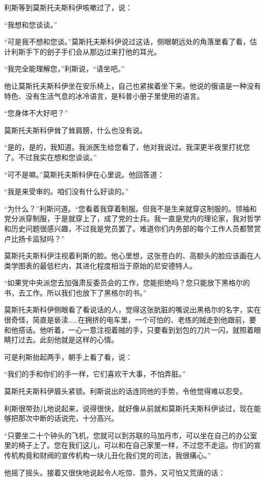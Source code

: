 利斯等到莫斯托夫斯科伊咳嗽过了，说：

“我想和您谈谈。”

“可是我不想和您谈。”莫斯托夫斯科伊说过这话，侧眼朝远处的角落里看了看，估计利斯手下的刽子手们会从那边过来打他的耳光。

“我完全能理解您，”利斯说，“请坐吧。”

他让莫斯托夫斯科伊坐在安乐椅上，自己也紧挨着坐下来。他说的俄语是一种没有特色、没有生活气息的冰冷语言，是科普小册子里使用的语言。

“您身体不大好吧？”

莫斯托夫斯科伊耸了耸肩膀，什么也没有说。

“是的，是的，我知道。我派医生给您看了，他对我说过。我深更半夜里打扰您了。不过我实在想和您谈谈。”

“可不是嘛。”莫斯托夫斯科伊在心里说。他回答道：

“我是来受审的。咱们没有什么好谈的。”

“为什么？”利斯问道。“您看着我穿着制服。但我不是生来就穿这制服的。领袖和党分派穿制服，于是就穿上了，成了党的士兵。我一直是党内的理论家，我对哲学和历史问题很感兴趣，不过我是党员罢了。难道你们内务部的每个工作人员都赞赏卢比扬卡监狱吗？”

莫斯托夫斯科伊注视着利斯的脸。他心里想，这张苍白的、高额头的脸应该画在人类学图表的最低栏内，其进化程度相当于原始的尼安德特人。

“如果党中央派您去加强肃反委员会的工作，您能拒绝吗？您只能放下黑格尔的书，去工作。所以我们也放下了黑格尔的书。”

莫斯托夫斯科伊侧眼看了看说话的人，觉得这张肮脏的嘴说出黑格尔的名字，实在很奇怪，简直是亵渎……在拥挤的电车里，一个可怕的、老练的贼走到他跟前，要和他搭话。他听着，一心一意注视着贼的手，只要看到划包的刀片一闪，就照着眼睛打过去。此刻他就是这样的心情。

可是利斯抬起两手，朝手上看了看，说：

“我们的手和你们的手一样，它们喜欢干大事，不怕弄脏。”

莫斯托夫斯科伊眉头紧锁。利斯说出的话连同他的手势，令他觉得难以忍受。

利斯很带劲儿地说起来，说得很快，就好像从前就和莫斯托夫斯科伊谈过，现在能够把那次中断的话说完，十分高兴。

“只要坐二十个钟头的飞机，您就可以到苏联的马加丹市，可以坐在自己的办公室里的椅子上了。您在我们这儿，可以和在自己家里一样，不过您不走运。你们的宣传机构竟和财阀的宣传机构一块儿丑化我们党的司法，我很痛心。”

他摇了摇头。接着又很快地说起令人吃惊、意外，又可怕又荒唐的话：


